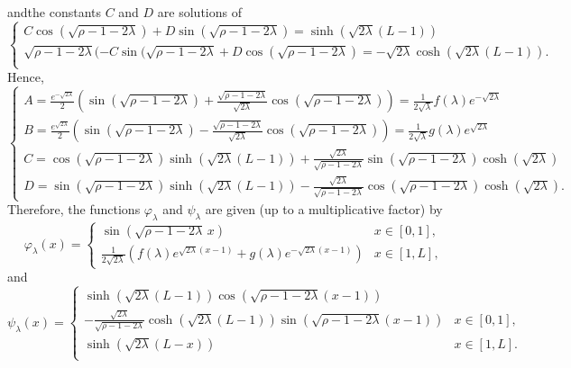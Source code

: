 \documentclass[11pt]{article}
\theoremstyle{plain}
\begin{document}
andthe constants $C$ and $D$ are solutions of
\begin{equation*}
     \begin{cases}
C\cos(\sqrt{\rho-1-2\lambda})+D\sin(\sqrt{\rho-1-2\lambda})=\sinh(\sqrt{2\lambda}(L-1))\\
\sqrt{\rho-1-2\lambda}(-C\sin(\sqrt{\rho-1-2\lambda}+D\cos(\sqrt{\rho-1-2\lambda})=-\sqrt{2\lambda}\cosh(\sqrt{2\lambda}(L-1)).\\
    \end{cases}
\end{equation*}
Hence, 
$$\begin{cases}
A=\frac{e^{-\sqrt{2\lambda}}}{2}\left(\sin(\sqrt{\rho-1-2\lambda})+\frac{\sqrt{\rho-1-2\lambda}}{\sqrt{2\lambda}}\cos(\sqrt{\rho-1-2\lambda})\right)=\frac{1}{2\sqrt{\lambda}}f(\lambda)e^{-\sqrt{2\lambda}}\\
B=\frac{e^{\sqrt{2\lambda}}}{2}\left(\sin(\sqrt{\rho-1-2\lambda})-\frac{\sqrt{\rho-1-2\lambda}}{\sqrt{2\lambda}}\cos(\sqrt{\rho-1-2\lambda})\right)=\frac{1}{2\sqrt{\lambda}}g(\lambda)e^{\sqrt{2\lambda}}\\
C=\cos(\sqrt{\rho-1-2\lambda})\sinh(\sqrt{2\lambda}(L-1))+\frac{\sqrt{2\lambda}}{\sqrt{\rho-1-2\lambda}}\sin(\sqrt{\rho-1-2\lambda})\cosh(\sqrt{2\lambda})\\
D=\sin(\sqrt{\rho-1-2\lambda})\sinh(\sqrt{2\lambda}(L-1))-\frac{\sqrt{2\lambda}}{\sqrt{\rho-1-2\lambda}}\cos(\sqrt{\rho-1-2\lambda})\cosh(\sqrt{2\lambda}).
    \end{cases}$$
Therefore, the functions $\varphi_\lambda$ and $\psi_\lambda$ are given  (up to a multiplicative factor) by 
\begin{equation}
    \varphi_\lambda (x)=\begin{cases}
    \sin(\sqrt{\rho-1-2\lambda}\,x) & x\in [0,1],\\
\frac{1}{2\sqrt{2\lambda}}\left(f(\lambda)e^{\sqrt{2\lambda}(x-1)}+g(\lambda)e^{-\sqrt{2\lambda}(x-1)}\right) &x\in[1,L],
    \end{cases}
    \label{nt:phi}
\end{equation}
and
\begin{equation}
    \psi_\lambda(x)=\begin{cases}
 \sinh(\sqrt{2\lambda}(L-1))\cos(\sqrt{\rho-1-2\lambda}(x-1)) & \\
 -\frac{\sqrt{2\lambda}}{\sqrt{\rho-1-2\lambda}}\cosh(\sqrt{2\lambda}(L-1))\sin(\sqrt{\rho-1-2\lambda}(x-1)) & x\in [0,1],\\
   \sinh(\sqrt{2\lambda}(L-x))  & x\in[1,L].\\
    \end{cases}
    \label{nt:psi}
\end{equation}
\end{document}
